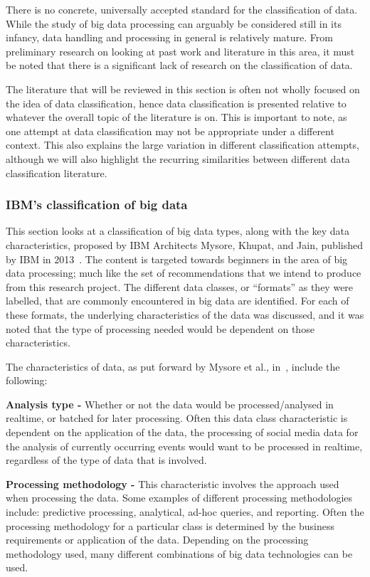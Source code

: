 \documentclass[a4paper,11pt]{article}
\begin{document}
There is no concrete, universally accepted standard for the classification of data. While the study of big data
processing can arguably be considered still in its infancy, data handling and processing in general is relatively
mature. From preliminary research on looking at past work and literature in this area, it must be noted that there is a
significant lack of research on the classification of data.

The literature that will be reviewed in this section is often not wholly focused on the idea of data classification,
hence data classification is presented relative to whatever the overall topic of the literature is on. This is important
to note, as one attempt at data classification may not be appropriate under a different context. This also explains the
large variation in different classification attempts, although we will also highlight the recurring similarities between
different data classification literature.


\subsubsection{IBM's classification of big data}
\label{ssub:data_charact}

This section looks at a classification of big data types, along with the key data characteristics, proposed by IBM
Architects Mysore, Khupat, and Jain, published by IBM in 2013~\cite{ibm_big_2013}. The content is targeted towards
beginners in the area of big data processing; much like the set of recommendations that we intend to produce from this
research project. The different data classes, or ``formats'' as they were labelled, that are commonly encountered in big
data are identified. For each of these formats, the underlying characteristics of the data was discussed, and it was
noted that the type of processing needed would be dependent on those characteristics.

\noindent The characteristics of data, as put forward by Mysore et al., in~\cite{ibm_big_2013}, include the following:

\noindent \textbf{Analysis type -} Whether or not the data would be processed/analysed in realtime, or batched for later
processing. Often this data class characteristic is dependent on the application of the data, \eg{}the processing of
social media data for the analysis of currently occurring events would want to be processed in realtime, regardless of
the type of data that is involved.

\noindent \textbf{Processing methodology -} This characteristic involves the approach used when processing the data.
Some examples of different processing methodologies include: predictive processing, analytical, ad-hoc queries, and
reporting. Often the processing methodology for a particular class is determined by the business requirements or
application of the data. Depending on the processing methodology used, many different combinations of big data
technologies can be used.
\end{document}
